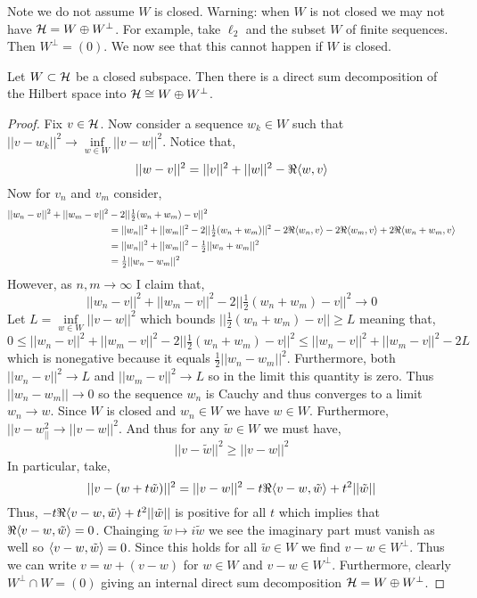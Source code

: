 \documentclass[12pt]{article}
\begin{document}
\begin{rmk}
Note we do not assume $W$ is closed.
Warning: when $W$ is not closed we may not have $\mathcal{H} = W \oplus W^\perp$. For example, take $\ell_2$ and the subset $W$ of finite sequences. Then $W^\perp = (0)$. We now see that this cannot happen if $W$ is closed.
\end{rmk}


\begin{prop}
Let $W \subset \mathcal{H}$ be a closed subspace. Then there is a direct sum decomposition of the Hilbert space into $\mathcal{H} \cong W \oplus W^\perp$. 
\end{prop}

\begin{proof}
Fix $v \in \mathcal{H}$. Now consider a sequence $w_k \in W$ such that $|| v - w_k ||^2 \to \inf\limits_{w \in W} || v - w ||^2$. Notice that,
\[ || w - v ||^2 = || v ||^2 + || w ||^2 - \Re{\left< w , v \right>} \]  
Now for $v_n$ and $v_m$ consider,
\begin{align*}
|| w_n - v ||^2 + || w_m - v ||^2 & - 2 || \tfrac{1}{2}(w_n + w_m) - v ||^2
\\
& = || w_n ||^2 + || w_m ||^2 - 2 || \tfrac{1}{2} (w_n + w_m) ||^2 - 2 \Re{\left< w_n , v \right>} - 2 \Re{\left< w_m , v \right>} + 2 \Re{\left< w_n + w_m , v \right>}
\\
& = || w_n ||^2 + || w_m ||^2 - \tfrac{1}{2} || w_n + w_m ||^2 
\\
& = \tfrac{1}{2} || w_n - w_m ||^2
\end{align*}
However, as $n, m \to \infty$ I claim that,
\[ || w_n - v ||^2 + || w_m - v ||^2 - 2 || \tfrac{1}{2}(w_n + w_m) - v ||^2 \to 0 \]
Let $L = \inf\limits_{w \in W} || v - w ||^2$ which bounds $|| \tfrac{1}{2}(w_n + w_m) - v || \ge L$ meaning that,
\[ 0 \le || w_n - v ||^2 + || w_m - v ||^2 - 2 || \tfrac{1}{2}(w_n + w_m) - v ||^2 \le || w_n - v ||^2 + || w_m - v ||^2 - 2 L \]
which is nonegative because it equals $\tfrac{1}{2} || w_n - w_m ||^2$. Furthermore, both $|| w_n - v ||^2 \to L$ and $|| w_m - v ||^2 \to L$ so in the limit this quantity is zero.
Thus $|| w_n - w_m || \to 0$ so the sequence $w_n$ is Cauchy and thus converges to a limit $w_n \to w$. Since $W$ is closed and $w_n \in W$ we have $w \in W$. Furthermore, $|| v - w_ ||^2 \to || v - w ||^2$. And thus for any $\tilde{w} \in W$ we must have,
\[ || v - \tilde{w} ||^2 \ge || v - w ||^2 \]
In particular, take,
\[ || v - (w + t \tilde{w}) ||^2 = || v - w ||^2 - t \Re{\left< v - w , \tilde{w} \right>} + t^2 || \tilde{w} || \]
Thus, $- t \Re{\left< v - w , \tilde{w} \right>} + t^2 || \tilde{w} ||$ is positive for all $t$ which implies that $\Re{\left< v - w , \tilde{w} \right>} = 0$. Chainging $\tilde{w} \mapsto i \tilde{w}$ we see the imaginary part must vanish as well so $\left< v - w , \tilde{w} \right> = 0$. Since this holds for all $\tilde{w} \in W$ we find $v - w \in W^\perp$. Thus we can write $v = w + (v - w)$ for $w \in W$ and $v - w \in W^\perp$. Furthermore, clearly $W^\perp \cap W = (0)$ giving an internal direct sum decomposition $\mathcal{H} = W \oplus W^\perp$.
\end{proof}
\end{document}

